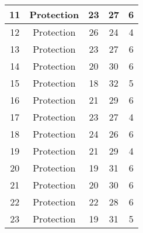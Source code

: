 \documentclass[results.tex]{subfiles}
\begin{document}
\begin{center}
\begin{tabular}{| c || c | c | c | c |}
            \hline
            11                      & Protection                   & 23                     & 27                      & 6                    \\
            \hline
            12                      & Protection                   & 26                     & 24                      & 4                    \\
            \hline
            13                      & Protection                   & 23                     & 27                      & 6                    \\
            \hline
            14                      & Protection                   & 20                     & 30                      & 6                    \\
            \hline
            15                      & Protection                   & 18                     & 32                      & 5                    \\
            \hline
            16                      & Protection                   & 21                     & 29                      & 6                    \\
            \hline
            17                      & Protection                   & 23                     & 27                      & 4                    \\
            \hline
            18                      & Protection                   & 24                     & 26                      & 6                    \\
            \hline
            19                      & Protection                   & 21                     & 29                      & 4                    \\
            \hline
            20                      & Protection                   & 19                     & 31                      & 6                    \\
            \hline
            21                      & Protection                   & 20                     & 30                      & 6                    \\
            \hline
            22                      & Protection                   & 22                     & 28                      & 6                    \\
            \hline
            23                      & Protection                   & 19                     & 31                      & 5                    \\

\end{tabular}
\end{center}
\end{document}
